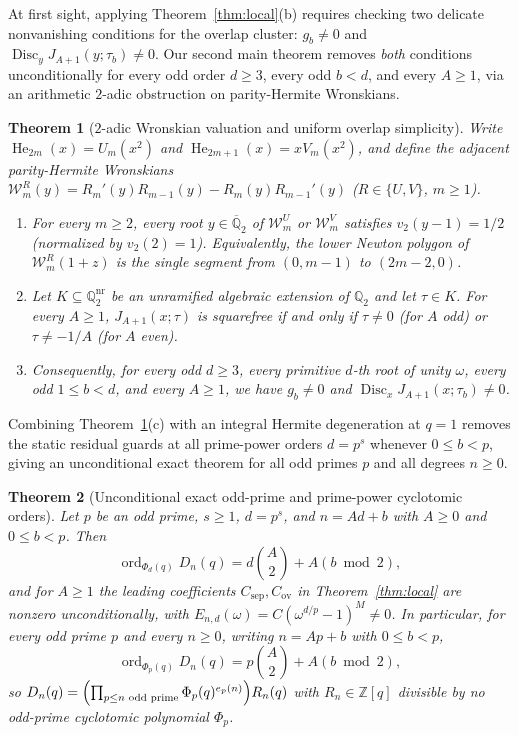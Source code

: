\documentclass[11pt,reqno]{amsart}
\numberwithin{equation}{section}
\newtheorem{theorem}{Theorem}[section]
\theoremstyle{definition}
\theoremstyle{remark}
\newcommand{\Q}{\mathbb{Q}}
\newcommand{\Z}{\mathbb{Z}}
\newcommand{\He}{\operatorname{He}}
\newcommand{\Disc}{\operatorname{Disc}}
\newcommand{\ord}{\operatorname{ord}}
\begin{document}
At first sight, applying Theorem~\ref{thm:local}(b) requires checking two delicate nonvanishing conditions for the overlap cluster: $g_b\neq 0$ and $\Disc_y J_{A+1}(y;\tau_b)\neq 0$. Our second main theorem removes \emph{both} conditions unconditionally for every odd order $d\ge 3$, every odd $b<d$, and every $A\ge 1$, via an arithmetic $2$-adic obstruction on parity-Hermite Wronskians.

\begin{theorem}[$2$-adic Wronskian valuation and uniform overlap simplicity]
\label{thm:2adic-main}
Write $\He_{2m}(x)=U_m(x^2)$ and $\He_{2m+1}(x)=xV_m(x^2)$, and define the adjacent parity-Hermite Wronskians $\mathcal{W}_m^R(y)=R_m'(y)R_{m-1}(y)-R_m(y)R_{m-1}'(y)$ ($R\in\{U,V\}$, $m\ge 1$).
\begin{enumerate}[label=(\alph*),leftmargin=2em]
\item For every $m\ge 2$, every root $y\in\overline{\Q}_2$ of $\mathcal{W}_m^U$ or $\mathcal{W}_m^V$ satisfies $v_2(y-1)=1/2$ (normalized by $v_2(2)=1$). Equivalently, the lower Newton polygon of $\mathcal{W}_m^R(1+z)$ is the single segment from $(0,m-1)$ to $(2m-2,0)$.
\item Let $K\subseteq\Q_2^{\mathrm{nr}}$ be an unramified algebraic extension of $\Q_2$ and let $\tau\in K$. For every $A\ge 1$, $J_{A+1}(x;\tau)$ is squarefree if and only if $\tau\neq 0$ (for $A$ odd) or $\tau\neq -1/A$ (for $A$ even).
\item Consequently, for \emph{every} odd $d\ge 3$, every primitive $d$-th root of unity $\omega$, every odd $1\le b<d$, and every $A\ge 1$, we have $g_b\neq 0$ and $\Disc_x J_{A+1}(x;\tau_b)\neq 0$.
\end{enumerate}
\end{theorem}

Combining Theorem~\ref{thm:2adic-main}(c) with an integral Hermite degeneration at $q=1$ removes the static residual guards at all prime-power orders $d=p^s$ whenever $0\le b<p$, giving an unconditional exact theorem for all odd primes $p$ and all degrees $n\ge 0$.

\begin{theorem}[Unconditional exact odd-prime and prime-power cyclotomic orders]
\label{thm:prime-uncond}
Let $p$ be an odd prime, $s\ge 1$, $d=p^s$, and $n=Ad+b$ with $A\ge 0$ and $0\le b<p$. Then
\begin{equation}
\label{eq:prime-order}
\ord_{\Phi_d(q)} D_n(q) = d\binom{A}{2} + A(b\bmod 2),
\end{equation}
and for $A\ge 1$ the leading coefficients $C_{\mathrm{sep}}, C_{\mathrm{ov}}$ in Theorem~\ref{thm:local} are nonzero unconditionally, with $E_{n,d}(\omega)=C(\omega^{d/p}-1)^M\neq 0$. In particular, for every odd prime $p$ and every $n\ge 0$, writing $n=Ap+b$ with $0\le b<p$,
\[
\ord_{\Phi_p(q)} D_n(q) = p\binom{A}{2} + A(b\bmod 2),
\]
so $D_n(q)=\Bigl(\prod_{p\le n\text{ odd prime}} \Phi_p(q)^{e_p(n)}\Bigr) R_n(q)$ with $R_n\in\Z[q]$ divisible by no odd-prime cyclotomic polynomial $\Phi_p$.
\end{theorem}
\end{document}
